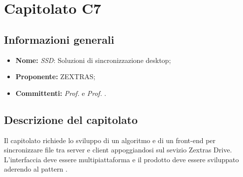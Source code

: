 \section{Capitolato C7}

\subsection{Informazioni generali}
\begin{itemize}
\item \textbf{Nome:} \textit{SSD}: Soluzioni di sincronizzazione desktop;
\item \textbf{Proponente:} ZEXTRAS;
\item \textbf{Committenti:} \textit{Prof. \Tullio{}} e \textit{Prof. \Riccardo{}}.
\end{itemize}

\subsection{Descrizione del capitolato}
Il capitolato richiede lo sviluppo di un algoritmo e di un front-end per sincronizzare file tra server e client appoggiandosi sul sevizio Zextras Drive.
L'interfaccia deve essere multipiattaforma e il prodotto deve essere sviluppato aderendo al pattern .

